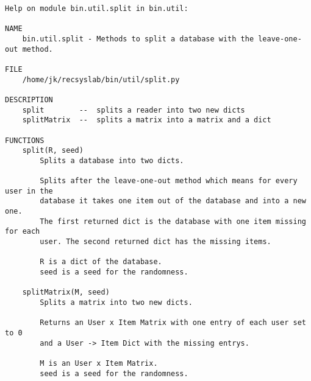 \begin{lstlisting}[style=docstring]
Help on module bin.util.split in bin.util:

NAME
    bin.util.split - Methods to split a database with the leave-one-out method.

FILE
    /home/jk/recsyslab/bin/util/split.py

DESCRIPTION
    split        --  splits a reader into two new dicts
    splitMatrix  --  splits a matrix into a matrix and a dict

FUNCTIONS
    split(R, seed)
        Splits a database into two dicts.
        
        Splits after the leave-one-out method which means for every user in the
        database it takes one item out of the database and into a new one.
        The first returned dict is the database with one item missing for each
        user. The second returned dict has the missing items.
        
        R is a dict of the database.
        seed is a seed for the randomness.
    
    splitMatrix(M, seed)
        Splits a matrix into two new dicts.
        
        Returns an User x Item Matrix with one entry of each user set to 0
        and a User -> Item Dict with the missing entrys.
        
        M is an User x Item Matrix.
        seed is a seed for the randomness.
\end{lstlisting}

